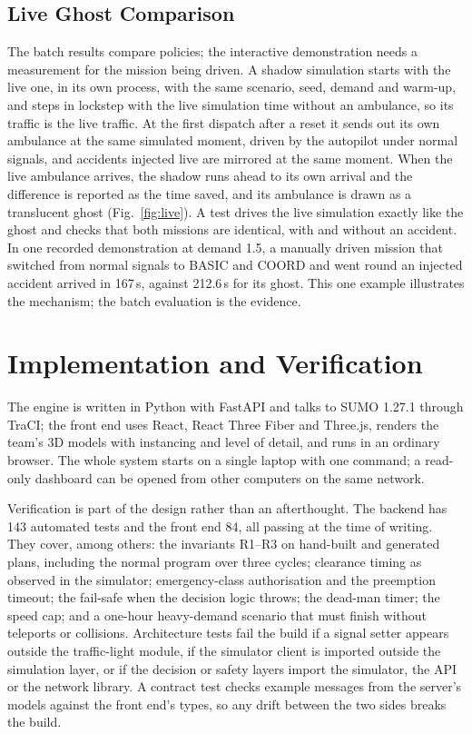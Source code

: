 \documentclass[conference]{IEEEtran}
\begin{document}
\subsection{Live Ghost Comparison}

The batch results compare policies; the interactive demonstration needs a measurement for the mission being driven. A shadow simulation starts with the live one, in its own process, with the same scenario, seed, demand and warm-up, and steps in lockstep with the live simulation time without an ambulance, so its traffic is the live traffic. At the first dispatch after a reset it sends out its own ambulance at the same simulated moment, driven by the autopilot under normal signals, and accidents injected live are mirrored at the same moment. When the live ambulance arrives, the shadow runs ahead to its own arrival and the difference is reported as the time saved, and its ambulance is drawn as a translucent ghost (Fig.~\ref{fig:live}). A test drives the live simulation exactly like the ghost and checks that both missions are identical, with and without an accident. In one recorded demonstration at demand 1.5, a manually driven mission that switched from normal signals to BASIC and COORD and went round an injected accident arrived in 167\,s, against 212.6\,s for its ghost. This one example illustrates the mechanism; the batch evaluation is the evidence.

\section{Implementation and Verification}

The engine is written in Python with FastAPI and talks to SUMO 1.27.1 through TraCI; the front end uses React, React Three Fiber and Three.js, renders the team's 3D models with instancing and level of detail, and runs in an ordinary browser. The whole system starts on a single laptop with one command; a read-only dashboard can be opened from other computers on the same network.

Verification is part of the design rather than an afterthought. The backend has 143 automated tests and the front end 84, all passing at the time of writing. They cover, among others: the invariants R1--R3 on hand-built and generated plans, including the normal program over three cycles; clearance timing as observed in the simulator; emergency-class authorisation and the preemption timeout; the fail-safe when the decision logic throws; the dead-man timer; the speed cap; and a one-hour heavy-demand scenario that must finish without teleports or collisions. Architecture tests fail the build if a signal setter appears outside the traffic-light module, if the simulator client is imported outside the simulation layer, or if the decision or safety layers import the simulator, the API or the network library. A contract test checks example messages from the server's models against the front end's types, so any drift between the two sides breaks the build.
\end{document}
